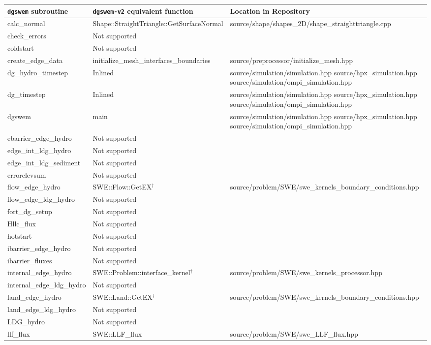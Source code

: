{ \scriptsize
\begin{longtable}{ l | p{55mm} | p{86mm} }
\hline
\hline
{\normalsize \texttt{dgswem} subroutine} & {\normalsize \texttt{dgswem-v2} equivalent function} & 
{\normalsize Location in Repository }
\tabularnewline \hline
calc\_normal	& Shape::StraightTriangle::GetSurfaceNormal	& source/shape/shapes\_2D/shape\_straighttriangle.cpp
\tabularnewline \hline
check\_errors & Not supported &
\tabularnewline \hline	
coldstart & Not supported &
\tabularnewline \hline	
create\_edge\_data & initialize\_mesh\_interfaces\_boundaries & source/preprocessor/initialize\_mesh.hpp
\tabularnewline \hline
dg\_hydro\_timestep & Inlined	& source/simulation/simulation.hpp \newline source/hpx\_simulation.hpp \newline source/simulation/ompi\_simulation.hpp
\tabularnewline \hline
dg\_timestep	& Inlined & source/simulation/simulation.hpp \newline source/hpx\_simulation.hpp \newline source/simulation/ompi\_simulation.hpp
\tabularnewline \hline
dgswem & main & source/simulation/simulation.hpp \newline source/hpx\_simulation.hpp \newline source/simulation/ompi\_simulation.hpp
\tabularnewline \hline
ebarrier\_edge\_hydro	& Not supported &	
\tabularnewline \hline
edge\_int\_ldg\_hydro & Not supported &
\tabularnewline \hline
edge\_int\_ldg\_sediment & Not supported &	
\tabularnewline \hline
errorelevsum & Not supported &
\tabularnewline \hline
flow\_edge\_hydro & SWE::Flow::GetEX$^\dagger$ & source/problem/SWE/swe\_kernels\_boundary\_conditions.hpp
\tabularnewline \hline
flow\_edge\_ldg\_hydro	& Not supported &
\tabularnewline \hline
fort\_dg\_setup & Not supported &	
\tabularnewline \hline
Hllc\_flux & Not supported &
\tabularnewline \hline
hotstart & Not supported &	
\tabularnewline \hline
ibarrier\_edge\_hydro	& Not supported &	
\tabularnewline \hline
ibarrier\_fluxes & Not supported &
\tabularnewline \hline
internal\_edge\_hydro & SWE::Problem::interface\_kernel$^\dagger$ & source/problem/SWE/swe\_kernels\_processor.hpp
\tabularnewline \hline
internal\_edge\_ldg\_hydro & Not supported &
\tabularnewline \hline
land\_edge\_hydro & SWE::Land::GetEX$^\dagger$ & source/problem/SWE/swe\_kernels\_boundary\_conditions.hpp
\tabularnewline \hline
land\_edge\_ldg\_hydro & Not supported &
\tabularnewline \hline
LDG\_hydro & Not supported &
\tabularnewline \hline
llf\_flux & SWE::LLF\_flux & source/problem/SWE/swe\_LLF\_flux.hpp

\end{longtable}}

